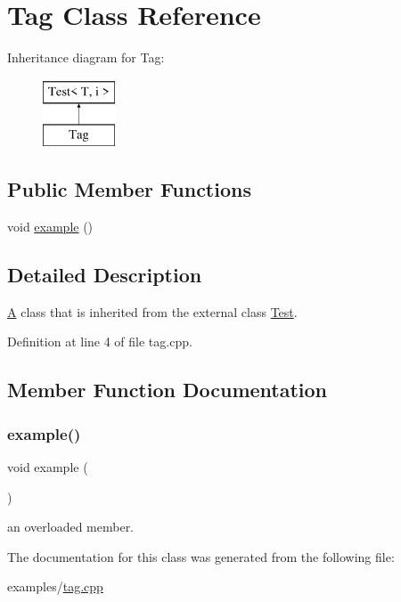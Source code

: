 \hypertarget{class_tag}{}\section{Tag Class Reference}
\label{class_tag}
Inheritance diagram for Tag\+:\begin{figure}[H]
\begin{center}
\leavevmode
\includegraphics[height=2.000000cm]{class_tag}
\end{center}
\end{figure}
\subsection*{Public Member Functions}
\begin{DoxyCompactItemize}
\item 
void \hyperlink{class_tag_afa2b50f4716fc3b42221a72e676e1422}{example} ()
\end{DoxyCompactItemize}


\subsection{Detailed Description}
\hyperlink{class_a}{A} class that is inherited from the external class \hyperlink{class_test}{Test}. 

Definition at line 4 of file tag.\+cpp.



\subsection{Member Function Documentation}
\mbox{\label{class_tag_afa2b50f4716fc3b42221a72e676e1422}} 
\subsubsection{\texorpdfstring{example()}{example()}}
{\footnotesize\ttfamily void example (\begin{DoxyParamCaption}{ }\end{DoxyParamCaption})}

an overloaded member. 

The documentation for this class was generated from the following file\+:\begin{DoxyCompactItemize}
\item 
examples/\hyperlink{tag_8cpp}{tag.\+cpp}\end{DoxyCompactItemize}
